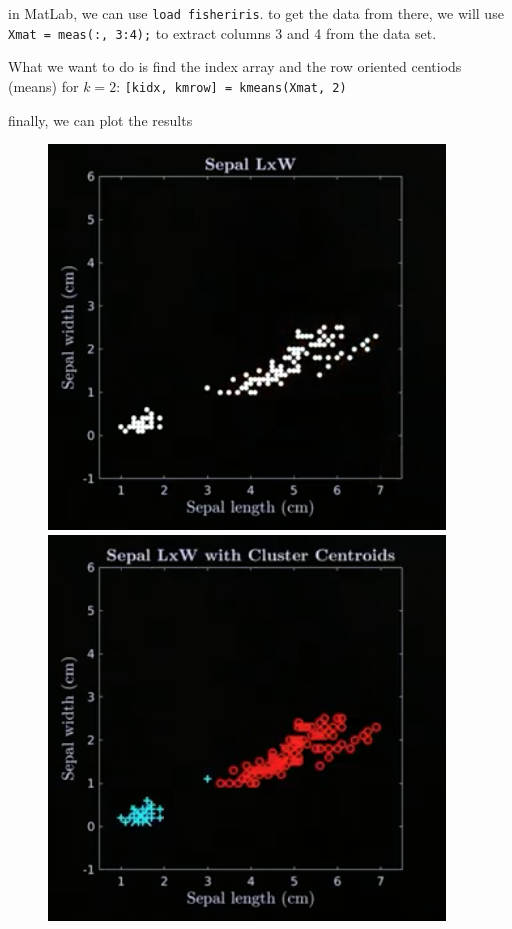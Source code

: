 \documentclass[12pt]{book}
\begin{document}
in MatLab, we can use \texttt{load fisheriris}. to get the data from there,
we will use \texttt{Xmat = meas(:, 3:4);} to extract columns 3 and 4 from
the data set. 

What we want to do is find the index array and the row oriented centiods (means)
for $k=2$: \texttt{[kidx, kmrow] = kmeans(Xmat, 2)}

finally, we can plot the results

\begin{figure}[h]
        \centering
        \includegraphics[scale=0.5]{./figures/iris1.png}
        \includegraphics[scale=0.5]{./figures/iris2.png}

\end{figure}
\end{document}
